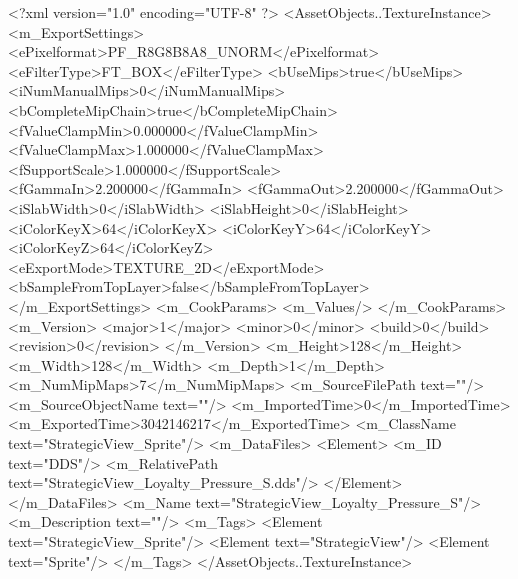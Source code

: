 <?xml version="1.0" encoding="UTF-8" ?>
<AssetObjects..TextureInstance>
	<m_ExportSettings>
		<ePixelformat>PF_R8G8B8A8_UNORM</ePixelformat>
		<eFilterType>FT_BOX</eFilterType>
		<bUseMips>true</bUseMips>
		<iNumManualMips>0</iNumManualMips>
		<bCompleteMipChain>true</bCompleteMipChain>
		<fValueClampMin>0.000000</fValueClampMin>
		<fValueClampMax>1.000000</fValueClampMax>
		<fSupportScale>1.000000</fSupportScale>
		<fGammaIn>2.200000</fGammaIn>
		<fGammaOut>2.200000</fGammaOut>
		<iSlabWidth>0</iSlabWidth>
		<iSlabHeight>0</iSlabHeight>
		<iColorKeyX>64</iColorKeyX>
		<iColorKeyY>64</iColorKeyY>
		<iColorKeyZ>64</iColorKeyZ>
		<eExportMode>TEXTURE_2D</eExportMode>
		<bSampleFromTopLayer>false</bSampleFromTopLayer>
	</m_ExportSettings>
	<m_CookParams>
		<m_Values/>
	</m_CookParams>
	<m_Version>
		<major>1</major>
		<minor>0</minor>
		<build>0</build>
		<revision>0</revision>
	</m_Version>
	<m_Height>128</m_Height>
	<m_Width>128</m_Width>
	<m_Depth>1</m_Depth>
	<m_NumMipMaps>7</m_NumMipMaps>
	<m_SourceFilePath text=""/>
	<m_SourceObjectName text=""/>
	<m_ImportedTime>0</m_ImportedTime>
	<m_ExportedTime>3042146217</m_ExportedTime>
	<m_ClassName text="StrategicView_Sprite"/>
	<m_DataFiles>
		<Element>
			<m_ID text="DDS"/>
			<m_RelativePath text="StrategicView_Loyalty_Pressure_{S}.dds"/>
		</Element>
	</m_DataFiles>
	<m_Name text="StrategicView_Loyalty_Pressure_{S}"/>
	<m_Description text=""/>
	<m_Tags>
		<Element text="StrategicView_Sprite"/>
		<Element text="StrategicView"/>
		<Element text="Sprite"/>
	</m_Tags>
</AssetObjects..TextureInstance>

